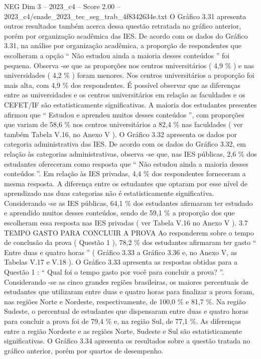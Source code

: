 \begin{textsample}{NEG Dim 3 – 2023\_c4 – Score 2.00 – 2023\_c4/enade\_2023\_tec\_seg\_trab\_4f8342634e.txt}
O Gráfico 3.31 apresenta outros resultados também acerca dessa questão retratada no gráfico anterior, porém por organização acadêmica das IES.
De acordo com os dados do Gráfico 3.31, na análise por organização acadêmica, a proporção de respondentes que escolheram a opção “ Não estudou ainda a maioria desses conteúdos ” foi pequena.
Observa -se que as proporções nos centros universitários ( 4,9 \% ) e nas universidades ( 4,2 \% ) foram menores.
Nos centros universitários a proporção foi mais alta, com 4,9 \% dos respondentes.
É possível observar que as diferenças entre as universidades e os centros universitários em relação as faculdades e os CEFET/IF são estatisticamente significativas.
A maioria dos estudantes presentes afirmou que “ Estudou e aprendeu muitos desses conteúdos ”, com proporções que variam de 58,6 \% nos centros universitários a 82,4 \% nas faculdades ( ver também Tabela V.16, no Anexo V ).
O Gráfico 3.32 apresenta os dados por categoria administrativa das IES.
De acordo com os dados do Gráfico 3.32, em relação às categorias administrativas, observa -se que, nas IES públicas, 2,6 \% dos estudantes ofereceram como resposta que “ Não estudou ainda a maioria desses conteúdos ”.
Em relação às IES privadas, 4,4 \% dos respondentes forneceram a mesma resposta.
A diferença entre os estudantes que optaram por esse nível de aprendizado nas duas categorias não é estatisticamente significativa.
Considerando -se as IES públicas, 64,1 \% dos estudantes afirmaram ter estudado e aprendido muitos desses conteúdos, sendo de 59,1 \% a proporção dos que escolheram essa resposta nas IES privadas ( ver Tabela V.16 no Anexo V ). 3.7 TEMPO GASTO PARA CONCLUIR A PROVA Ao responderem sobre o tempo de conclusão da prova ( Questão 1 ), 78,2 \% dos estudantes afirmaram ter gasto “ Entre duas e quatro horas ” ( Gráfico 3.33 a Gráfico 3.36 e, no Anexo V, as Tabelas V.17 e V.18 ).
O Gráfico 3.33 apresenta as respostas obtidas para a Questão 1 : “ Qual foi o tempo gasto por você para concluir a prova? ”.
Considerando -se as cinco grandes regiões brasileiras, os maiores percentuais de estudantes que utilizaram entre duas e quatro horas para finalizar a prova foram, nas regiões Norte e Nordeste, respectivamente, de 100,0 \% e 81,7 \%.
Na região Sudeste, o percentual de estudantes que dispensaram entre duas e quatro horas para concluir a prova foi de 79,4 \% e, na região Sul, de 77,1 \%.
As diferenças entre a região Nordeste e as regiões Norte, Sudeste e Sul são estatisticamente significativas.
O Gráfico 3.34 apresenta os resultados sobre a questão tratada no gráfico anterior, porém por quartos de desempenho.

\end{textsample}
